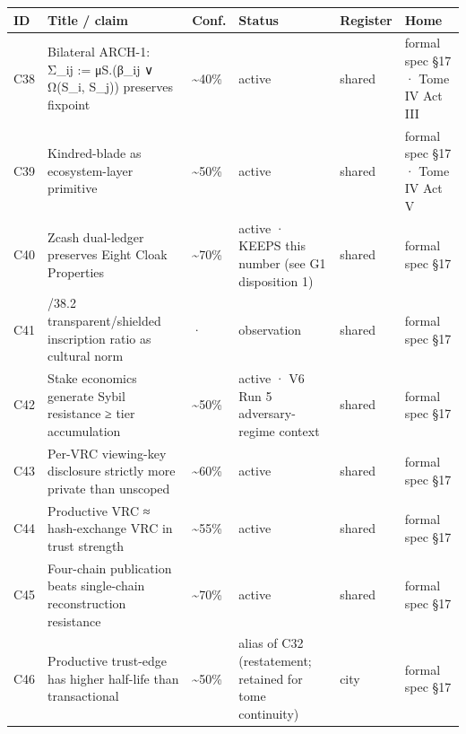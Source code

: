 \documentclass[
  11pt,
]{article}
\newcounter{none} %
\begin{document}
{\def\LTcaptype{none} %
\begin{longtable}[]{@{}
  >{\raggedright\arraybackslash}p{}
  >{\raggedright\arraybackslash}p{}
  >{\raggedright\arraybackslash}p{}
  >{\raggedright\arraybackslash}p{}
  >{\raggedright\arraybackslash}p{}
  >{\raggedright\arraybackslash}p{}@{}}
\toprule\noalign{}
\begin{minipage}[b]{\linewidth}\raggedright
ID
\end{minipage} & \begin{minipage}[b]{\linewidth}\raggedright
Title / claim
\end{minipage} & \begin{minipage}[b]{\linewidth}\raggedright
Conf.
\end{minipage} & \begin{minipage}[b]{\linewidth}\raggedright
Status
\end{minipage} & \begin{minipage}[b]{\linewidth}\raggedright
Register
\end{minipage} & \begin{minipage}[b]{\linewidth}\raggedright
Home
\end{minipage} \\
\midrule\noalign{}
\endhead
\bottomrule\noalign{}
\endlastfoot
C38 & Bilateral ARCH-1: Σ\_ij := μS.(β\_ij ∨ Ω(S\_i, S\_j)) preserves
fixpoint & \textasciitilde40\% & active & shared & formal spec §17 ·
Tome IV Act III \\
C39 & Kindred-blade as ecosystem-layer primitive & \textasciitilde50\% &
active & shared & formal spec §17 · Tome IV Act V \\
C40 & Zcash dual-ledger preserves Eight Cloak Properties &
\textasciitilde70\% & active · KEEPS this number (see G1 disposition 1)
& shared & formal spec §17 \\
C41 & 61.8/38.2 transparent/shielded inscription ratio as cultural norm
& · & observation & shared & formal spec §17 \\
C42 & Stake economics generate Sybil resistance ≥ tier accumulation &
\textasciitilde50\% & active · V6 Run 5 adversary-regime context &
shared & formal spec §17 \\
C43 & Per-VRC viewing-key disclosure strictly more private than unscoped
& \textasciitilde60\% & active & shared & formal spec §17 \\
C44 & Productive VRC ≈ hash-exchange VRC in trust strength &
\textasciitilde55\% & active & shared & formal spec §17 \\
C45 & Four-chain publication beats single-chain reconstruction
resistance & \textasciitilde70\% & active & shared & formal spec §17 \\
C46 & Productive trust-edge has higher half-life than transactional &
\textasciitilde50\% & alias of C32 (restatement; retained for tome
continuity) & city & formal spec §17 \\
\end{longtable}
}
\end{document}
